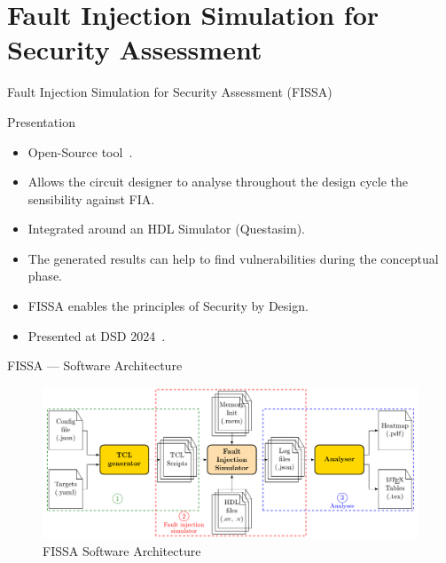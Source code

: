 \section{Fault Injection Simulation for Security Assessment}

\begin{frame}{Fault Injection Simulation for Security Assessment (FISSA)}
    \begin{block}{Presentation}
        \begin{itemize}
            \item Open-Source tool~\cite{fissa}.
            \item Allows the circuit designer to analyse throughout the design cycle the sensibility against FIA.
            \item Integrated around an HDL Simulator (Questasim).
            \item The generated results can help to find vulnerabilities during the conceptual phase.
            \item FISSA enables the principles of Security by Design.
            \item Presented at DSD 2024~\cite{PLG-24-dsd}.
        \end{itemize}
    \end{block}
\end{frame}

\begin{frame}{FISSA — Software Architecture}
    \begin{figure}
        \centering
        \includegraphics[width=.9\textwidth, page=2]{src/3_fissa/img/fissa/archi_fissa.pdf}
        \caption{FISSA Software Architecture}
        \label{fig:archiSoft}
    \end{figure}
\end{frame}

